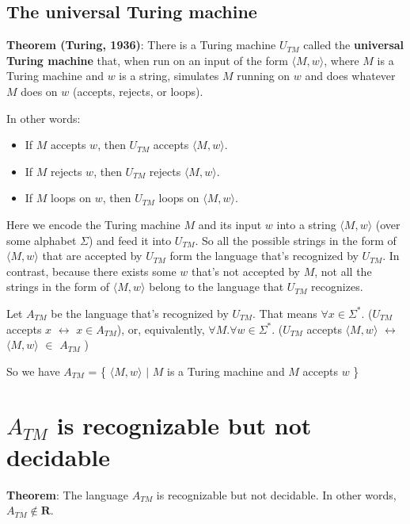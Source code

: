 \documentclass[12pt, letterpaper, oneside]{book}
\begin{document}
\subsection{The universal Turing machine}

\textbf{Theorem (Turing, 1936)}: There is a Turing machine $U_{TM}$ called the \textbf{universal Turing machine} that,
when run on an input of the form $\langle M, w\rangle$, where $M$ is a Turing machine and $w$ is a string, simulates
$M$ running on $w$ and does whatever $M$ does on $w$ (accepts, rejects, or loops).

In other words:
\begin{itemize}
  \item If $M$ accepts $w$, then $U_{TM}$ accepts $\langle M, w\rangle$.
  \item If $M$ rejects $w$, then $U_{TM}$ rejects $\langle M, w\rangle$.
  \item If $M$ loops on $w$, then $U_{TM}$ loops on $\langle M, w\rangle$.
\end{itemize}

Here we encode the Turing machine $M$ and its input $w$ into a string $\langle M, w\rangle$ (over some alphabet
$\Sigma$) and feed it into $U_{TM}$. So all the possible strings in the form of $\langle M, w\rangle$ that are accepted
by $U_{TM}$ form the language that's recognized by $U_{TM}$. In contrast, because there exists some $w$ that's not
accepted by $M$, not all the strings in the form of $\langle M, w\rangle$ belong to the language that $U_{TM}$
recognizes.

Let $A_{TM}$ be the language that's recognized by $U_{TM}$. That means $\forall x \in \Sigma^*.$ ($U_{TM}$ accepts $x$
$\leftrightarrow$ $x \in A_{TM}$), or, equivalently, $\forall M. \forall w \in \Sigma^*.$ ($U_{TM}$ accepts
$\langle M, w\rangle$ $\leftrightarrow$ $\langle M, w\rangle$ $\in$ $A_{TM}$ )

So we have $A_{TM}$ = \{ $\langle M, w\rangle$ $|$ $M$ is a Turing machine and $M$ accepts $w$ \}

\section{$A_{TM}$ is recognizable but not decidable}

\textbf{Theorem}: The language $A_{TM}$ is recognizable but not decidable. In other words, $A_{TM} \notin \textbf{R}$.
\end{document}
